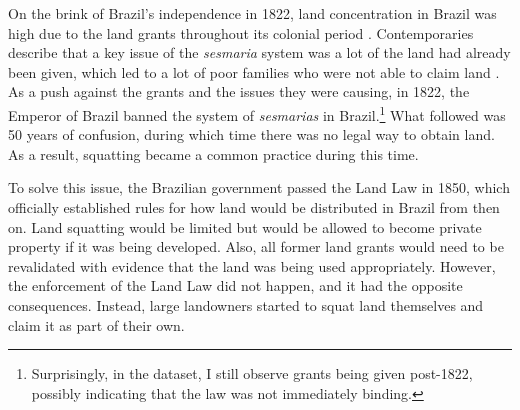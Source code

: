 \documentclass[11pt]{article}
\begin{document}
On the brink of Brazil's independence in 1822, land concentration in Brazil was high due to the land grants throughout its colonial period \parencite{Smith1972-dv}.
Contemporaries describe that a key issue of the \textit{sesmaria} system was a lot of the land had already been given, which led to a lot of poor families who were not able to claim land \parencite[p.~42-43]{Lima1954-td}.
As a push against the grants and the issues they were causing, in 1822, the Emperor of Brazil banned the system of \textit{sesmarias} in Brazil.\footnote{Surprisingly, in the dataset, I still observe grants being given post-1822, possibly indicating that the law was not immediately binding.}
What followed was 50 years of confusion, during which time there was no legal way to obtain land. 
As a result, squatting became a common practice during this time.

To solve this issue, the Brazilian government passed the Land Law in 1850, which officially established rules for how land would be distributed in Brazil from then on. 
Land squatting would be limited but would be allowed to become private property if it was being developed.
Also, all former land grants would need to be revalidated with evidence that the land was being used appropriately.
However, the enforcement of the Land Law did not happen, and it had the opposite consequences.
Instead, large landowners started to squat land themselves and claim it as part of their own.



\end{document}

